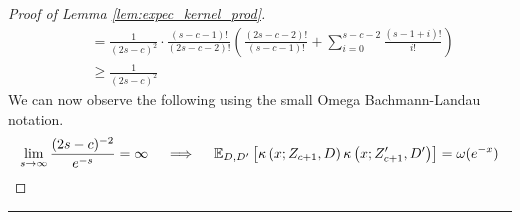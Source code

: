 \begin{proof}[Proof of Lemma \ref{lem:expec_kernel_prod}]
\begin{equation}
\begin{aligned}
            & \quad = \frac{1}{(2s-c)^{2}} \cdot \frac{(s-c-1)!}{(2s-c-2)!}\left(\frac{(2s-c-2)!}{(s-c-1)!} + \sum_{i = 0}^{s-c-2} \frac{(s-1+i)!}{i!}\right)\\
            & \quad \geq \frac{1}{(2s-c)^{2}}
        \end{aligned}
    \end{equation}
        We can now observe the following using the small Omega Bachmann-Landau notation.
    \begin{equation}
        \lim_{s \rightarrow \infty} \frac{(2s-c)^{-2}}{e^{-s}} = \infty
        \quad \implies \quad
        \mathbb{E}_{D, D^{\prime}}\left[\kappa\left(x; Z_{c+1}, D\right)\kappa\left(x; Z_{c+1}^{\prime}, D^{\prime}\right)\right]
        = \omega(e^{-x})
    \end{equation}
\end{proof}

\hrule

